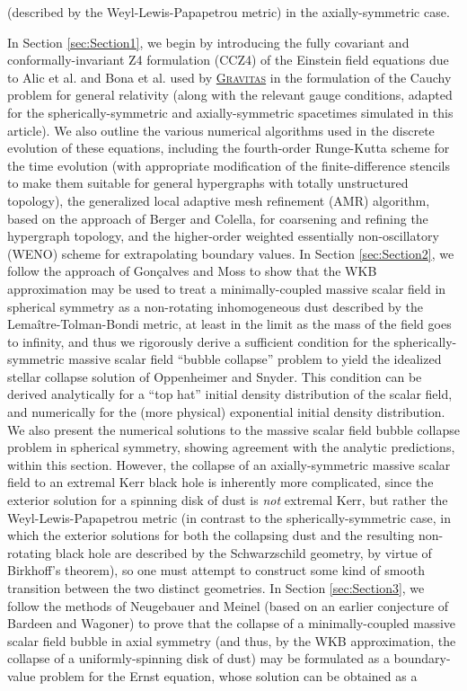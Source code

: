 \documentclass{article}
\begin{document}
(described by the Weyl-Lewis-Papapetrou metric\cite{weyl}\cite{lewis}\cite{papapetrou}) in the axially-symmetric case.

In Section \ref{sec:Section1}, we begin by introducing the fully covariant and conformally-invariant Z4 formulation (CCZ4) of the Einstein field equations due to Alic et al. \cite{alic} and Bona et al.\cite{bona} used by \href{https://github.com/JonathanGorard/Gravitas}{\textsc{Gravitas}} in the formulation of the Cauchy problem for general relativity (along with the relevant gauge conditions, adapted for the spherically-symmetric and axially-symmetric spacetimes simulated in this article). We also outline the various numerical algorithms used in the discrete evolution of these equations, including the fourth-order Runge-Kutta scheme for the time evolution (with appropriate modification of the finite-difference stencils to make them suitable for general hypergraphs with totally unstructured topology), the generalized local adaptive mesh refinement (AMR) algorithm, based on the approach of Berger and Colella\cite{berger}, for coarsening and refining the hypergraph topology, and the higher-order weighted essentially non-oscillatory (WENO) scheme for extrapolating boundary values. In Section \ref{sec:Section2}, we follow the approach of Gon\c{c}alves and Moss\cite{goncalves} to show that the WKB approximation may be used to treat a minimally-coupled massive scalar field in spherical symmetry as a non-rotating inhomogeneous dust described by the Lema\^itre-Tolman-Bondi metric, at least in the limit as the mass of the field goes to infinity, and thus we rigorously derive a sufficient condition for the spherically-symmetric massive scalar field ``bubble collapse'' problem to yield the idealized stellar collapse solution of Oppenheimer and Snyder. This condition can be derived analytically for a ``top hat'' initial density distribution of the scalar field, and numerically for the (more physical) exponential initial density distribution. We also present the numerical solutions to the massive scalar field bubble collapse problem in spherical symmetry, showing agreement with the analytic predictions, within this section. However, the collapse of an axially-symmetric massive scalar field to an extremal Kerr black hole is inherently more complicated, since the exterior solution for a spinning disk of dust is \textit{not} extremal Kerr, but rather the Weyl-Lewis-Papapetrou metric (in contrast to the spherically-symmetric case, in which the exterior solutions for both the collapsing dust and the resulting non-rotating black hole are described by the Schwarzschild geometry, by virtue of Birkhoff's theorem), so one must attempt to construct some kind of smooth transition between the two distinct geometries. In Section \ref{sec:Section3}, we follow the methods of Neugebauer and Meinel\cite{neugebauer}\cite{neugebauer2}\cite{neugebauer3} (based on an earlier conjecture of Bardeen and Wagoner\cite{bardeen}\cite{bardeen2}) to prove that the collapse of a minimally-coupled massive scalar field bubble in axial symmetry (and thus, by the WKB approximation, the collapse of a uniformly-spinning disk of dust) may be formulated as a boundary-value problem for the Ernst equation, whose solution can be obtained as a 
\end{document}
